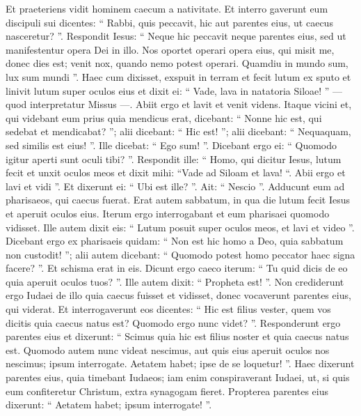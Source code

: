 \begin{biblechapter}
\begin{biblechapter}
\begin{biblechapter}
\begin{biblechapter}
\begin{biblechapter}
\begin{biblechapter}
\begin{biblechapter}
\begin{biblechapter}
\begin{biblechapter}
\verse Et praeteriens vidit hominem caecum a nativitate. 
\verse Et interro gaverunt eum discipuli sui dicentes: “ Rabbi, quis peccavit, hic aut parentes eius, ut caecus nasceretur? ”. 
\verse Respondit Iesus: “ Neque hic peccavit neque parentes eius, sed ut manifestentur opera Dei in illo. 
\verse Nos oportet operari opera eius, qui misit me, donec dies est; venit nox, quando nemo potest operari. 
\verse Quamdiu in mundo sum, lux sum mundi ”. 
\verse Haec cum dixisset, exspuit in terram et fecit lutum ex sputo et linivit lutum super oculos eius 
\verse et dixit ei: “ Vade, lava in natatoria Siloae! ” — quod interpretatur Missus —. Abiit ergo et lavit et venit videns. 
\verse Itaque vicini et, qui videbant eum prius quia mendicus erat, dicebant: “ Nonne hic est, qui sedebat et mendicabat? ”; 
\verse alii dicebant: “ Hic est! ”; alii dicebant: “ Nequaquam, sed similis est eius! ”. Ille dicebat: “ Ego sum! ”. 
\verse Dicebant ergo ei: “ Quomodo igitur aperti sunt oculi tibi? ”. 
\verse Respondit ille: “ Homo, qui dicitur Iesus, lutum fecit et unxit oculos meos et dixit mihi: “Vade ad Siloam et lava! “. Abii ergo et lavi et vidi ”. 
\verse Et dixerunt ei: “ Ubi est ille? ”. Ait: “ Nescio ”.
 \verse Adducunt eum ad pharisaeos, qui caecus fuerat. 
\verse Erat autem sabbatum, in qua die lutum fecit Iesus et aperuit oculos eius. 
\verse Iterum ergo interrogabant et eum pharisaei quomodo vidisset. Ille autem dixit eis: “ Lutum posuit super oculos meos, et lavi et video ”. 
\verse Dicebant ergo ex pharisaeis quidam: “ Non est hic homo a Deo, quia sabbatum non custodit! ”; alii autem dicebant: “ Quomodo potest homo peccator haec signa facere? ”. Et schisma erat in eis. 
\verse Dicunt ergo caeco iterum: “ Tu quid dicis de eo quia aperuit oculos tuos? ”. Ille autem dixit: “ Propheta est! ”. 
\verse Non crediderunt ergo Iudaei de illo quia caecus fuisset et vidisset, donec vocaverunt parentes eius, qui viderat. 
\verse Et interrogaverunt eos dicentes: “ Hic est filius vester, quem vos dicitis quia caecus natus est? Quomodo ergo nunc videt? ”. 
\verse Responderunt ergo parentes eius et dixerunt: “ Scimus quia hic est filius noster et quia caecus natus est. 
\verse Quomodo autem nunc videat nescimus, aut quis eius aperuit oculos nos nescimus; ipsum interrogate. Aetatem habet; ipse de se loquetur! ”. 
\verse Haec dixerunt parentes eius, quia timebant Iudaeos; iam enim conspiraverant Iudaei, ut, si quis eum confiteretur Christum, extra synagogam fieret. 
\verse Propterea parentes eius dixerunt: “ Aetatem habet; ipsum interrogate! ”.

\end{biblechapter}
\end{biblechapter}
\end{biblechapter}
\end{biblechapter}
\end{biblechapter}
\end{biblechapter}
\end{biblechapter}
\end{biblechapter}
\end{biblechapter}
